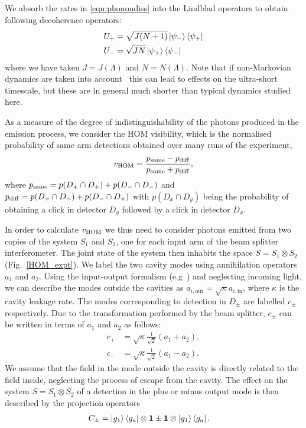 We absorb the rates in \eqref{eqn:phonondiss} into the Lindblad operators to obtain following decoherence operators:
\begin{eqnarray}
  U_+ &= \sqrt{J(N+1)}\left\vert \psi_- \right\rangle \left\langle \psi_+ \right\vert \\
  U_- &= \sqrt{JN}\left\vert \psi_+ \right\rangle \left\langle \psi_- \right\vert
\end{eqnarray}
where we have taken $J = J(\Lambda)$ and $N = N(\Lambda)$. Note that if non-Markovian dynamics are taken into account~\cite{neilsen12} this can lead to effects on the ultra-short timescale, but these are in general much shorter than typical dynamics studied here.

As a measure of the degree of indistinguishability of the photons produced in the emission process, we consider the HOM visibility, which is the normalised probability of same arm detections obtained over many runs of the experiment,
\begin{eqnarray}
v_{\rm HOM} = \frac{p_{\rm same} - p_{\rm diff}}{p_{\rm same} + p_{\rm diff}},
\end{eqnarray}
where $p_{\rm same}  = p(D_+ \cap D_+) + p({D_- \cap D_-})$ and $p_{\rm diff}  = p(D_+ \cap D_-) + p({D_- \cap D_+})$ with $p(D_x \cap D_y)$ being the probability of obtaining a click in detector $D_y$ followed by a click in detector $D_x$.

In order to calculate $v_{\rm HOM}$ we thus need to consider photons emitted from two copies of the system $S_1$ and $S_2$, one for each input arm of the beam splitter interferometer. The joint state of the system then inhabits the space $S= S_1 \otimes S_2$ (Fig.~\ref{HOM_expt}).
We label the two cavity modes using annihilation operators $a_1$ and $a_2$. Using the input-output formalism (e.g~\cite{walls+milburn}) and neglecting incoming light, we can describe the modes outside the cavities as $a_{i, \text{out}} = \sqrt{\kappa}a_{i, \text{in}}$, where $\kappa$ is the cavity leakage rate. The modes corresponding to detection in $D_\pm$ are labelled $c_\pm$ respectively. Due to the transformation performed by the beam splitter, $c_\pm$ can be written in terms of $a_1$ and $a_2$ as follows:
\begin{eqnarray}
  c_+ &= \sqrt{\kappa} \frac{1}{\sqrt{2}}\left( a_1 + a_2 \right), \\
  c_- &= \sqrt{\kappa} \frac{1}{\sqrt{2}}\left( a_1 - a_2 \right).
\end{eqnarray}
We assume that the field in the mode outside the cavity is directly related to the field inside, neglecting the process of escape from the cavity.
The effect on the system $S= S_1 \otimes S_2$ of a detection in the plus or minus output mode is then described by the projection operators
\begin{eqnarray}
  C_\pm &= \left\vert g_1 \right\rangle \left\langle g_a \right\vert\otimes\mathbf{1} \pm \mathbf{1}\otimes\left\vert g_1 \right\rangle \left\langle g_a \right\vert.
\end{eqnarray}


